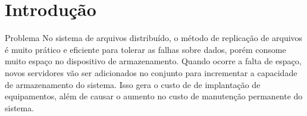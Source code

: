 \section{Introdução}

\begin{frame}{Problema}
	No sistema de arquivos distribuído, o método de replicação de arquivos é muito prático e eficiente para tolerar as falhas sobre dados, porém consome muito espaço no dispositivo de armazenamento. Quando ocorre a falta de espaço, novos servidores vão ser adicionados no conjunto para incrementar a capacidade de armazenamento do sistema. Isso gera o custo de de implantação de equipamentos, além de causar o aumento no custo de manutenção permanente do sistema.
\end{frame} 